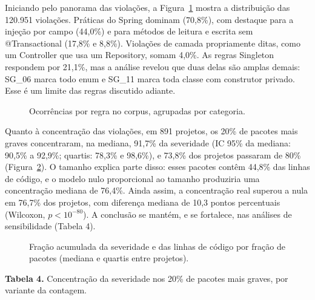 \documentclass[
  a4paper,
]{article}
\begin{document}
Iniciando pelo panorama das violações, a Figura~\ref{fig:regras} mostra a distribuição das 120.951 violações. Práticas do Spring dominam (70,8\%), com destaque para a injeção por campo (44,0\%) e para métodos de leitura e escrita sem @Transactional (17,8\% e 8,8\%). Violações de camada propriamente ditas, como um Controller que usa um Repository, somam 4,0\%. As regras Singleton respondem por 21,1\%, mas a análise revelou que duas delas são amplas demais: SG\_06 marca todo enum e SG\_11 marca toda classe com construtor privado. Esse é um limite das regras discutido adiante.

\begin{figure}[htbp]
\centering

\caption{Ocorrências por regra no corpus, agrupadas por categoria.}
\label{fig:regras}
\end{figure}

Quanto à concentração das violações, em 891 projetos, os 20\% de pacotes mais graves concentraram, na mediana, 91,7\% da severidade (IC 95\% da mediana: 90,5\% a 92,9\%; quartis: 78,3\% e 98,6\%), e 73,8\% dos projetos passaram de 80\% (Figura~\ref{fig:concentracao}). O tamanho explica parte disso: esses pacotes contêm 44,8\% das linhas de código, e o modelo nulo proporcional ao tamanho produziria uma concentração mediana de 76,4\%. Ainda assim, a concentração real superou a nula em 76,7\% dos projetos, com diferença mediana de 10,3 pontos percentuais (Wilcoxon, $p < 10^{-80}$). A conclusão se mantém, e se fortalece, nas análises de sensibilidade (Tabela 4).

\begin{figure}[htbp]
\centering

\caption{Fração acumulada da severidade e das linhas de código por fração de pacotes (mediana e quartis entre projetos).}
\label{fig:concentracao}
\end{figure}

\textbf{Tabela 4.} Concentração da severidade nos 20\% de pacotes mais graves, por variante da contagem.
\end{document}
